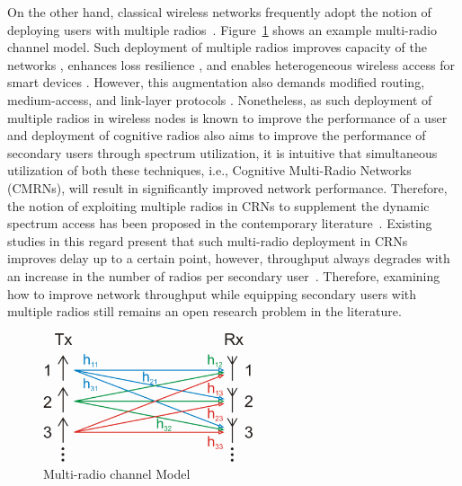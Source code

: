 
On the other hand, classical wireless networks frequently adopt the notion of deploying users with multiple radios~\cite{bahl2004reconsidering, adya2004multi}. Figure~\ref{fig:MIMO} shows an example multi-radio channel model. Such deployment of multiple radios improves capacity of the networks \cite{draves2004routing, bahl2004reconsidering}, enhances loss resilience \cite{miu2005improving}, and enables heterogeneous wireless access for smart devices \cite{song2012performance}. However, this augmentation also demands modified routing, medium-access, and link-layer protocols \cite{kyasanur2006routing, chatterjee2013low}. Nonetheless, as such deployment of multiple radios in wireless nodes is known to improve the performance of a user and  deployment of cognitive radios also aims to improve the performance of secondary users through spectrum utilization, it is intuitive that simultaneous utilization of both these techniques, i.e., Cognitive Multi-Radio Networks (CMRNs), will result in significantly improved network performance. Therefore, the notion of exploiting multiple radios in CRNs to supplement the dynamic spectrum access has been proposed in the contemporary literature~\cite{li2014deterministic, zhong2014capacity, khan2015towards}. Existing studies in this regard present that such multi-radio deployment in CRNs improves delay up to a certain point, however, throughput always degrades with an increase in the number of radios per secondary user~\cite{khan2015towards}. Therefore, examining how to improve network throughput while equipping secondary users with multiple radios still remains an open research problem in the literature.

\begin{figure}[!htbp]
    \begin{center}
        \includegraphics[width=0.55\textwidth]{myFigures/MIMO.png}
        \caption{Multi-radio channel Model~\cite{mimoWiki}}
        \label{fig:MIMO}
    \end{center}
\end{figure}

